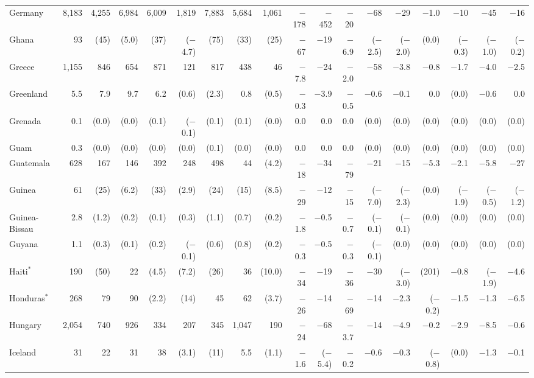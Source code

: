 \begin{longtable}{lrrrrrrrrrrrrrrrrr}
Germany & 8,183 & 4,255 & 6,984 & 6,009 & 1,819 & 7,883 & 5,684 & 1,061 & $-$178 & $-$452 & $-$20 & $-$68 & $-$29 & $-$1.0 & $-$10 & $-$45 & $-$16 \\
Ghana & 93 & (45) & (5.0) & (37) & ($-$4.7) & (75) & (33) & (25) & $-$67 & $-$19 & $-$6.9 & ($-$2.5) & ($-$2.0) & (0.0) & ($-$0.3) & ($-$1.0) & ($-$0.2) \\
Greece & 1,155 & 846 & 654 & 871 & 121 & 817 & 438 & 46 & $-$7.8 & $-$24 & $-$2.0 & $-$58 & $-$3.8 & $-$0.8 & $-$1.7 & $-$4.0 & $-$2.5 \\
Greenland & 5.5 & 7.9 & 9.7 & 6.2 & (0.6) & (2.3) & 0.8 & (0.5) & $-$0.3 & $-$3.9 & $-$0.5 & $-$0.6 & $-$0.1 & 0.0 & (0.0) & $-$0.6 & 0.0 \\
Grenada & 0.1 & (0.0) & (0.0) & (0.1) & ($-$0.1) & (0.1) & (0.1) & (0.0) & 0.0 & 0.0 & 0.0 & (0.0) & (0.0) & (0.0) & (0.0) & (0.0) & (0.0) \\
Guam & 0.3 & (0.0) & (0.0) & (0.0) & (0.0) & (0.1) & (0.0) & (0.0) & 0.0 & 0.0 & 0.0 & (0.0) & (0.0) & (0.0) & (0.0) & (0.0) & (0.0) \\
Guatemala & 628 & 167 & 146 & 392 & 248 & 498 & 44 & (4.2) & $-$18 & $-$34 & $-$79 & $-$21 & $-$15 & $-$5.3 & $-$2.1 & $-$5.8 & $-$27 \\
Guinea & 61 & (25) & (6.2) & (33) & (2.9) & (24) & (15) & (8.5) & $-$29 & $-$12 & $-$15 & ($-$7.0) & ($-$2.3) & (0.0) & ($-$1.9) & ($-$0.5) & ($-$1.2) \\
Guinea-Bissau & 2.8 & (1.2) & (0.2) & (0.1) & (0.3) & (1.1) & (0.7) & (0.2) & $-$1.8 & $-$0.5 & $-$0.7 & ($-$0.1) & ($-$0.1) & (0.0) & (0.0) & (0.0) & (0.0) \\
Guyana & 1.1 & (0.3) & (0.1) & (0.2) & ($-$0.1) & (0.6) & (0.8) & (0.2) & $-$0.3 & $-$0.5 & $-$0.3 & ($-$0.1) & (0.0) & (0.0) & (0.0) & (0.0) & (0.0) \\
Haiti$^{*}$ & 190 & (50) & 22 & (4.5) & (7.2) & (26) & 36 & (10.0) & $-$34 & $-$19 & $-$36 & $-$30 & ($-$3.0) & (201) & $-$0.8 & ($-$1.9) & $-$4.6 \\
Honduras$^{*}$ & 268 & 79 & 90 & (2.2) & (14) & 45 & 62 & (3.7) & $-$26 & $-$14 & $-$69 & $-$14 & $-$2.3 & ($-$0.2) & $-$1.5 & $-$1.3 & $-$6.5 \\
Hungary & 2,054 & 740 & 926 & 334 & 207 & 345 & 1,047 & 190 & $-$24 & $-$68 & $-$3.7 & $-$14 & $-$4.9 & $-$0.2 & $-$2.9 & $-$8.5 & $-$0.6 \\
Iceland & 31 & 22 & 31 & 38 & (3.1) & (11) & 5.5 & (1.1) & $-$1.6 & ($-$5.4) & $-$0.2 & $-$0.6 & $-$0.3 & ($-$0.8) & (0.0) & $-$1.3 & $-$0.1 \\

\end{longtable}
